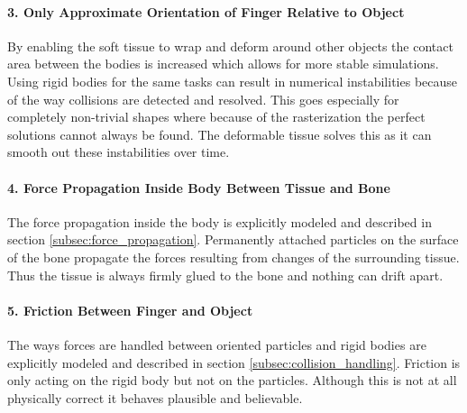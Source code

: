 \paragraph{3. Only Approximate Orientation of Finger Relative to Object}

By enabling the soft tissue to wrap and deform around other objects the contact area between the bodies is increased which allows for more stable simulations. Using rigid bodies for the same tasks can result in numerical instabilities because of the way collisions are detected and resolved. This goes especially for completely non-trivial shapes where because of the rasterization the perfect solutions cannot always be found. The deformable tissue solves this as it can smooth out these instabilities over time.

\paragraph{4. Force Propagation Inside Body Between Tissue and Bone}

The force propagation inside the body is explicitly modeled and described in section \ref{subsec:force_propagation}. Permanently attached particles on the surface of the bone propagate the forces resulting from changes of the surrounding tissue. Thus the tissue is always firmly glued to the bone and nothing can drift apart.

\paragraph{5. Friction Between Finger and Object}

The ways forces are handled between oriented particles and rigid bodies are explicitly modeled and described in section \ref{subsec:collision_handling}. Friction is only acting on the rigid body but not on the particles. Although this is not at all physically correct it behaves plausible and believable.
